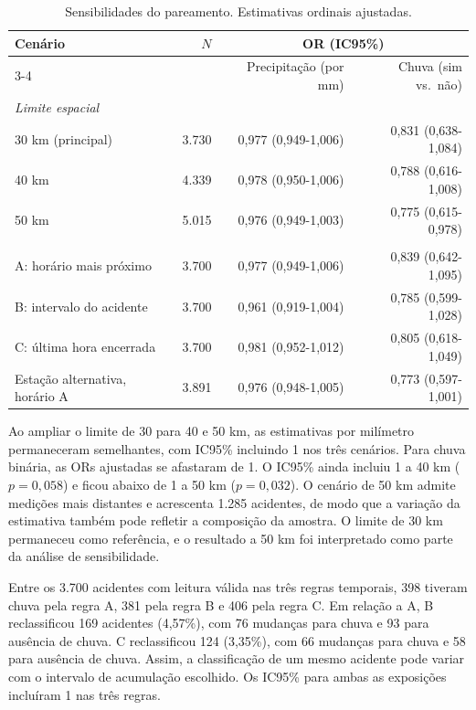 \documentclass[12pt]{article}
\begin{document}
\begin{table}[H]
    \centering
    \caption{Sensibilidades do pareamento. Estimativas ordinais ajustadas.}
    \label{tab:robustez}
    \footnotesize
    \begin{tabular}{lrrr}
        \toprule
        Cenário & $N$ & \multicolumn{2}{c}{OR (IC95\%)} \\
        \cmidrule(lr){3-4}
                  &      & Precipitação (por mm) & Chuva (sim vs.\ não) \\
        \midrule
        \multicolumn{4}{l}{\textit{Limite espacial}} \\
        30 km (principal) & 3.730 & 0,977 (0,949-1,006) & 0,831 (0,638-1,084) \\
        40 km             & 4.339 & 0,978 (0,950-1,006) & 0,788 (0,616-1,008) \\
        50 km             & 5.015 & 0,976 (0,949-1,003) & 0,775 (0,615-0,978) \\
        \addlinespace
        \multicolumn{4}{l}{\textit{Horários nos mesmos acidentes}} \\
        A: horário mais próximo  & 3.700 & 0,977 (0,949-1,006) & 0,839 (0,642-1,095) \\
        B: intervalo do acidente & 3.700 & 0,961 (0,919-1,004) & 0,785 (0,599-1,028) \\
        C: última hora encerrada & 3.700 & 0,981 (0,952-1,012) & 0,805 (0,618-1,049) \\
        \addlinespace
        Estação alternativa, horário A & 3.891 & 0,976 (0,948-1,005) & 0,773 (0,597-1,001) \\
        \bottomrule
    \end{tabular}
\end{table}

Ao ampliar o limite de 30 para 40 e 50 km, as estimativas por
milímetro permaneceram semelhantes, com IC95\% incluindo 1 nos três
cenários. Para chuva binária, as ORs ajustadas se afastaram de 1.
O IC95\% ainda incluiu 1 a 40 km ($p=0{,}058$) e ficou abaixo de 1
a 50 km ($p=0{,}032$). O cenário de 50 km admite medições mais distantes
e acrescenta 1.285 acidentes, de modo que a variação da estimativa
também pode refletir a composição da amostra. O limite de 30 km
permaneceu como referência, e o resultado a 50 km foi interpretado
como parte da análise de sensibilidade.

Entre os 3.700 acidentes com leitura válida nas três regras temporais,
398 tiveram chuva pela regra A, 381 pela regra B e 406 pela regra C.
Em relação a A, B reclassificou 169 acidentes (4,57\%), com 76
mudanças para chuva e 93 para ausência de chuva. C reclassificou 124
(3,35\%), com 66 mudanças para chuva e 58 para ausência de chuva.
Assim, a classificação de um mesmo acidente pode variar com o intervalo
de acumulação escolhido. Os IC95\% para ambas as exposições incluíram
1 nas três regras.
\end{document}
